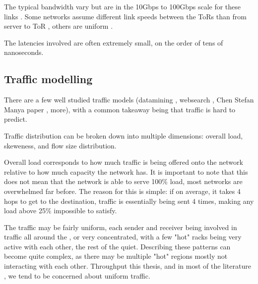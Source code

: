 The typical bandwidth vary but are in the 10Gbps to 100Gbps scale for these links .
Some networks assume different link speeds between the ToRs than from server to ToR , others are uniform . 

The latencies involved are often extremely small, on the order of tens of nanoseconds. 


\subsection{Traffic modelling} \label{model-traffic}

There are a few well studied \datacenter traffic models (datamining , websearch , Chen Stefan Manya paper , more), with a common takeaway being that \datacenter traffic is hard to predict.

Traffic distribution can be broken down into multiple dimensions: overall load, skeweness, and flow size distribution.


Overall load corresponds to how much traffic is being offered onto the network relative to how much capacity the network has.
It is important to note that this does not mean that the network is able to serve 100\% load, most networks are overwhelmed far before.
The reason for this is simple: if on average, it takes 4 hops to get to the destination, traffic is essentially being sent 4 times, making any load above 25\% impossible to satisfy. 

The traffic may be fairly uniform, each sender and receiver being involved in traffic all around the \datacenter, or very concentrated, with a few "hot" racks being very active with each other, the rest of the \datacenter quiet. 
Describing these patterns can become quite complex, as there may be multiple "hot" regions mostly not interacting with each other.
Throughput this thesis, and in most of the literature , we tend to be concerned about uniform traffic. 

